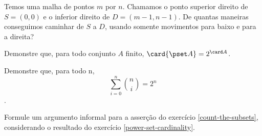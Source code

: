 \begin{exercise}
Temos uma malha de pontos $m$ por $n$. Chamamos o ponto superior direito de $S = (0,0)$ e o inferior direito de $D = (m-1, n-1)$. De quantas maneiras conseguimos caminhar de $S$ a $D$, usando somente movimentos para baixo e para a direita?
\end{exercise}

\begin{exercise}
\label{power-set-cardinality}
Demonstre que, para todo conjunto $A$ finito, $\card{\pset A} = 2^{\card A}$.
\end{exercise}

\begin{exercise}
\label{count-the-subsets}
Demonstre que, para todo n, $$\sum_{i=0}^n \binom n i = 2^n$$.
\end{exercise}

\begin{exercise}
Formule um argumento informal para a asserção do exercício \ref{count-the-subsets}, considerando o resultado do exercício \ref{power-set-cardinality}.
\end{exercise}

